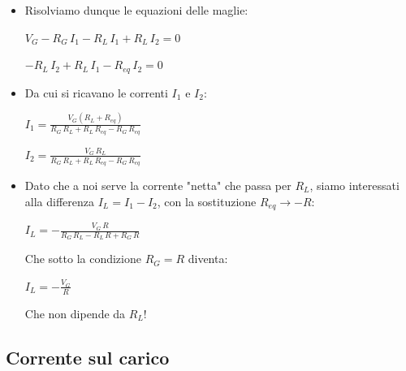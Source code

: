 \documentclass{beamer}
\begin{document}
\begin{frame}
\begin{itemize}
\item Risolviamo dunque le equazioni delle maglie:
\begin{definition}
$V_G - R_G \, I_1 - R_L \, I_1 + R_L \, I_2 = 0$
\end{definition}
\begin{definition}
$-R_L \, I_2 + R_L \, I_1 - R_{eq}\,I_2 = 0$
\end{definition}

\item Da cui si ricavano le correnti $I_1$ e $I_2$:
\begin{definition}
$I_1 = \frac{V_G (R_L + R_{eq})}{R_G\,R_L + R_L\,R_{eq} - R_G \, R_{eq}}$
\end{definition}
\begin{definition}
$I_2 = \frac{V_G \,R_L}{R_G\,R_L + R_L\,R_{eq} - R_G \, R_{eq}}$
\end{definition}
\end{itemize}
\end{frame}

\begin{frame}
\begin{itemize}
\item Dato che a noi serve la corrente "netta" che passa per $R_L$, siamo interessati alla differenza $I_L = I_1 - I_2$, con la sostituzione $R_{eq} \rightarrow -R$:

\begin{example}
$I_L = - \frac{V_G \, R}{R_G \, R_L - R_L \, R + R_G \, R}$
\end{example}

Che sotto la condizione $R_G = R$ diventa:

\begin{example}
$I_L = - \frac{V_G}{R}$
\end{example}

Che non dipende da $R_L$!
\end{itemize}
\end{frame}

\subsection{Corrente sul carico}
\end{document}
